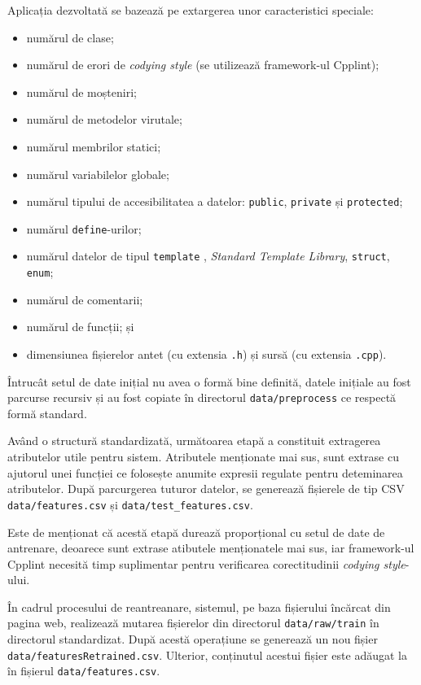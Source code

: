 \documentclass{article}
\begin{document}
Aplicația dezvoltată se bazează pe extargerea unor caracteristici speciale:
\begin{itemize}
    \item numărul de clase;
    \item numărul de erori de \textit{codying style} (se utilizează framework-ul Cpplint);
    \item numărul de moșteniri;
    \item numărul de metodelor virutale;
    \item numărul membrilor statici;
    \item numărul variabilelor globale;
    \item numărul tipului de accesibilitatea a datelor:  \texttt{public}, \texttt{private} și \texttt{protected};
    \item numărul \texttt{define}-urilor;
    \item numărul datelor de tipul \texttt{template} , \textit{Standard Template Library}, \texttt{struct}, \texttt{enum};
    \item numărul de comentarii;
    \item numărul de funcții; și
    \item dimensiunea fișierelor antet (cu extensia \texttt{.h}) și sursă (cu extensia \texttt{.cpp}).
\end{itemize}

Întrucât setul de date inițial nu avea o formă bine definită, datele inițiale au fost parcurse recursiv și au fost copiate în directorul \texttt{data/preprocess} ce respectă formă standard.

Având o structură standardizată, următoarea etapă a constituit extragerea atributelor utile pentru sistem. Atributele menționate mai sus, sunt extrase cu ajutorul unei funcției ce folosește anumite expresii regulate pentru deteminarea atributelor. După parcurgerea tuturor datelor, se generează fișierele de tip CSV \texttt{data/features.csv} și \texttt{data/test_features.csv}.

Este de menționat că acestă etapă durează proporțional cu setul de date de antrenare, deoarece sunt extrase atibutele menționatele mai sus, iar framework-ul Cpplint necesită timp suplimentar pentru verificarea corectitudinii \textit{codying style}-ului.

În cadrul procesului de reantreanare, sistemul, pe baza fișierului încărcat din pagina web, realizează mutarea fișierelor din directorul \texttt{data/raw/train} în directorul standardizat. După acestă operațiune se generează un nou fișier \texttt{data/featuresRetrained.csv}. Ulterior, conținutul acestui fișier este adăugat la în fișierul \texttt{data/features.csv}.
\end{document}
